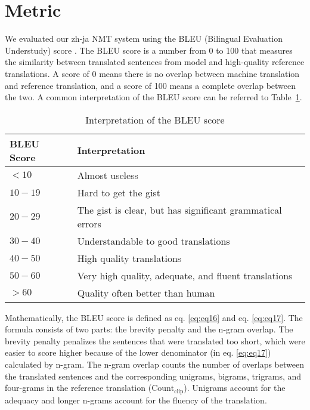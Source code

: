 \section{Metric} \label{sec:metric}

We evaluated our zh-ja NMT system using the BLEU (Bilingual Evaluation Understudy) score \cite{papineni2002bleu}. The BLEU score is a number from 0 to 100 that measures the similarity between translated sentences from model and high-quality reference translations. A score of 0 means there is no overlap between machine translation and reference translation, and a score of 100 means a complete overlap between the two. A common interpretation of the BLEU score can be referred to Table~\ref{tab:bleu_score_interpretation}.

\newpage

\vspace{0.4cm}
\begin{table}[h]
    \centering
    \begin{tabularx}{\textwidth}{p{3cm}b}\toprule
        BLEU Score & Interpretation \\\midrule
        $< 10$ & Almost useless \\
        $10 - 19$ & Hard to get the gist \\
        $20 - 29$ & The gist is clear, but has significant grammatical errors \\
        $30 - 40$ & Understandable to good translations \\
        $40 - 50$ & High quality translations \\
        $50 - 60$ & Very high quality, adequate, and fluent translations \\
        $> 60$ & Quality often better than human \\
    \end{tabularx}
    \caption[Interpretation of the BLEU score]{Interpretation of the BLEU score\protect\footnotemark}
    \label{tab:bleu_score_interpretation}
\end{table}


Mathematically, the BLEU score is defined as eq. \ref{eq:eq16} and eq. \ref{eq:eq17}. The formula consists of two parts: the brevity penalty and the n-gram overlap. The brevity penalty penalizes the sentences that were translated too short, which were easier to score higher because of the lower denominator (in eq. \ref{eq:eq17}) calculated by n-gram. The n-gram overlap counts the number of overlaps between the translated sentences and the corresponding unigrams, bigrams, trigrams, and four-grams in the reference translation ($\text{Count}_\text{clip}$). Unigrams account for the adequacy and longer n-grams account for the fluency of the translation.

